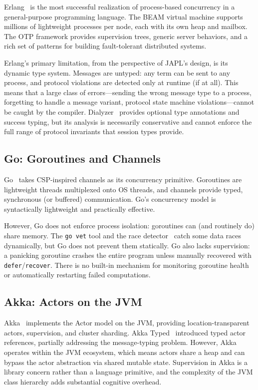 \documentclass[11pt,a4paper]{article}
\begin{document}
Erlang~\citep{armstrong2003making,armstrong2007programming} is the most successful realization of process-based concurrency in a general-purpose programming language. The BEAM virtual machine supports millions of lightweight processes per node, each with its own heap and mailbox. The OTP framework provides supervision trees, generic server behaviors, and a rich set of patterns for building fault-tolerant distributed systems.

Erlang's primary limitation, from the perspective of JAPL's design, is its dynamic type system. Messages are untyped: any term can be sent to any process, and protocol violations are detected only at runtime (if at all). This means that a large class of errors---sending the wrong message type to a process, forgetting to handle a message variant, protocol state machine violations---cannot be caught by the compiler. Dialyzer~\citep{lindahl2006practical} provides optional type annotations and success typing, but its analysis is necessarily conservative and cannot enforce the full range of protocol invariants that session types provide.

\subsection{Go: Goroutines and Channels}

Go~\citep{pike2012concurrency,donovan2015go} takes CSP-inspired channels as its concurrency primitive. Goroutines are lightweight threads multiplexed onto OS threads, and channels provide typed, synchronous (or buffered) communication. Go's concurrency model is syntactically lightweight and practically effective.

However, Go does not enforce process isolation: goroutines can (and routinely do) share memory. The \texttt{go vet} tool and the race detector~\citep{serebryany2012threadsanitizer} catch some data races dynamically, but Go does not prevent them statically. Go also lacks supervision: a panicking goroutine crashes the entire program unless manually recovered with \texttt{defer}/\texttt{recover}. There is no built-in mechanism for monitoring goroutine health or automatically restarting failed computations.

\subsection{Akka: Actors on the JVM}

Akka~\citep{lightbend2023akka} implements the Actor model on the JVM, providing location-transparent actors, supervision, and cluster sharding. Akka Typed~\citep{roestenburg2016akka} introduced typed actor references, partially addressing the message-typing problem. However, Akka operates within the JVM ecosystem, which means actors share a heap and can bypass the actor abstraction via shared mutable state. Supervision in Akka is a library concern rather than a language primitive, and the complexity of the JVM class hierarchy adds substantial cognitive overhead.
\end{document}

